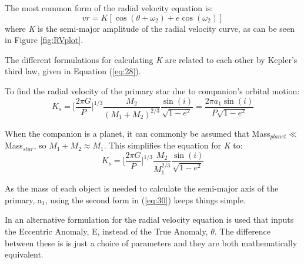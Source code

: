 \documentclass[10pt,preprint]{aastex}
\begin{document}
The most common form of the radial velocity equation is:
\begin{equation}\label{eq:rvStandard}
vr =  K[\cos(\theta+\omega_2)+e \cos(\omega_2)]
\end{equation}
where {\it K} is the semi-major amplitude of the radial velocity curve, as can be seen in Figure \ref{fig:RVplot}.

The different formulations for calculating {\it K} are related to each other by Kepler's third law, given in Equation (\ref{eq:28}).

To find the radial velocity of the primary star due to companion's orbital motion: %
\begin{equation}\label{eq:30}
K_s = \bigg[\frac{2\pi G}{P}\bigg]^{1/3}\frac{M_2}{(M_1+M_2)^{2/3}}\frac{\sin(i)}{\sqrt{1-e^2}} = \frac{2\pi a_1\sin(i)}{P\sqrt{1-e^2}}
\end{equation}

When the companion is a planet, it can commonly be assumed that Mass$_{planet} \ll$ Mass$_{star}$, so $M_1+M_2 \approx M_1$.  This simplifies the equation for {\it K} to:
\begin{equation}\label{eq:31}
K_s = \bigg[\frac{2\pi G}{P}\bigg]^{1/3}\frac{M_2}{M_1^{2/3}}\frac{\sin(i)}{\sqrt{1-e^2}}
\end{equation}

As the mass of each object is needed to calculate the semi-major axis of the primary, a$_1$, using the second form in (\ref{eq:30}) keeps things simple.



In \citet{Shulze-Hartung} an alternative formulation for the radial velocity equation is used that inputs the Eccentric Anomaly, E, instead of the True Anomaly, $\theta$.  The difference between these is is just a choice of parameters and they are both mathematically equivalent.
\end{document}
